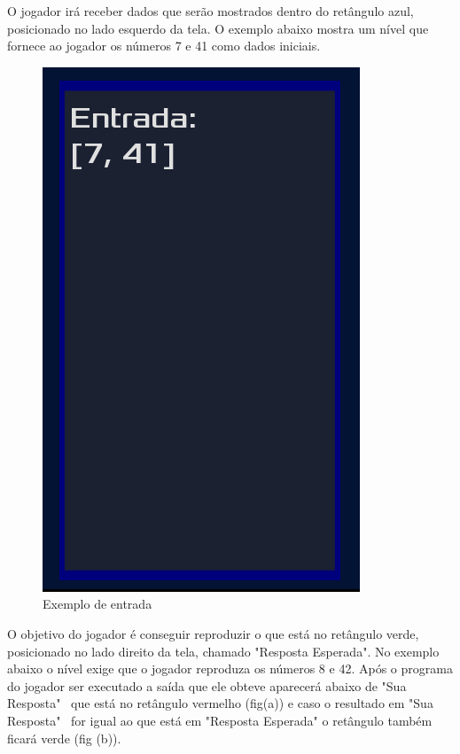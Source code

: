 O jogador irá receber dados que serão mostrados dentro do retângulo azul, 
posicionado no lado esquerdo da tela. O exemplo abaixo mostra um nível que
fornece  ao jogador os números 7 e 41 como dados iniciais.

\begin{figure}[H]
    \includegraphics[scale=0.3]{../figuras/entrada.png}
    \caption{Exemplo de entrada}
\end{figure}

O objetivo do jogador é conseguir reproduzir o que está no retângulo verde, 
posicionado no lado direito da tela,
chamado "Resposta Esperada". No exemplo abaixo o nível exige que o jogador
reproduza os números 8 e 42. Após o programa do jogador ser executado a saída 
que ele obteve aparecerá abaixo de "Sua Resposta" \ que está no retângulo vermelho
(fig(a)) e caso o resultado em "Sua Resposta" \ for igual ao que está em 
"Resposta Esperada" o retângulo também ficará verde (fig (b)).

